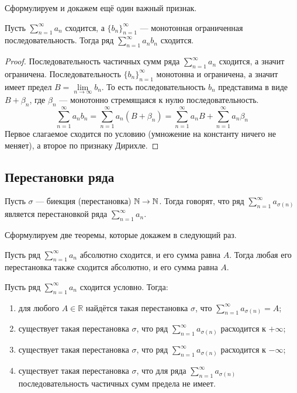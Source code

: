 \documentclass[a4paper, 12pt]{article}
\begin{document}
	Сформулируем и докажем ещё один важный признак.
	\begin{Test}
		Пусть $\sum\limits_{n=1}^{\infty}a_n$ сходится, а $\{b_n\}_{n=1}^{\infty}$ --- монотонная ограниченная последовательность. Тогда ряд $\sum\limits_{n=1}^{\infty}a_nb_n$ сходится.
	\end{Test}
	\begin{proof}
		Последовательность частичных сумм ряда $\sum\limits_{n=1}^{\infty}a_n$ сходится, а значит ограничена. Последовательность $\{b_n\}_{n=1}^{\infty}$ монотонна и ограничена, а значит имеет предел $B = \lim\limits_{n\to \infty} b_n$. То есть последовательность $b_n$ представима в виде $B + \beta_n$, где $\beta_n$ --- монотонно стремящаяся к нулю последовательность. 
		$$
		\sum\limits_{n=1}^{\infty}a_nb_n = \sum_{n=1}^{\infty} a_n(B+\beta_n) = \sum\limits_{n=1}^{\infty} a_nB + \sum_{n=1}^{\infty} a_n\beta_n
		$$
		Первое слагаемое сходится по условию (умножение на константу ничего не меняет), а второе по признаку Дирихле.
	\end{proof}
	
	\subsection{Перестановки ряда}
	\begin{Def}
		Пусть $\sigma$ --- биекция (перестановка) $\mathbb{N} \to \mathbb{N}$. Тогда говорят, что ряд $\sum\limits_{n=1}^{\infty}a_{\sigma(n)}$ является перестановкой ряда $\sum\limits_{n=1}^{\infty}a_n$.
	\end{Def}
	Сформулируем две теоремы, которые докажем в следующий раз.
	\begin{Theorem}[Коши]
		Пусть ряд $\sum\limits_{n=1}^{\infty}a_n$ абсолютно сходится, и его сумма равна $A$. Тогда любая его перестановка также сходится абсолютно, и его сумма равна $A$.
	\end{Theorem}
	\begin{Theorem}[Римана]
		Пусть ряд $\sum\limits_{n=1}^{\infty}a_n$ сходится условно. Тогда:
		\begin{enumerate}
			\item для любого $A \in \mathbb{R}$ найдётся такая перестановка $\sigma$, что $\sum\limits_{n=1}^{\infty}a_{\sigma(n)} = A $;
			\item существует такая перестановка $\sigma$, что ряд $\sum\limits_{n=1}^{\infty}a_{\sigma(n)}$ расходится к $+\infty$;
			\item существует такая перестановка $\sigma$, что ряд $\sum\limits_{n=1}^{\infty}a_{\sigma(n)}$ расходится к $-\infty$;
			\item существует такая перестановка $\sigma$, что для ряда $\sum\limits_{n=1}^{\infty}a_{\sigma(n)}$ последовательность частичных сумм предела не имеет.
		\end{enumerate}
	\end{Theorem}
\end{document}
